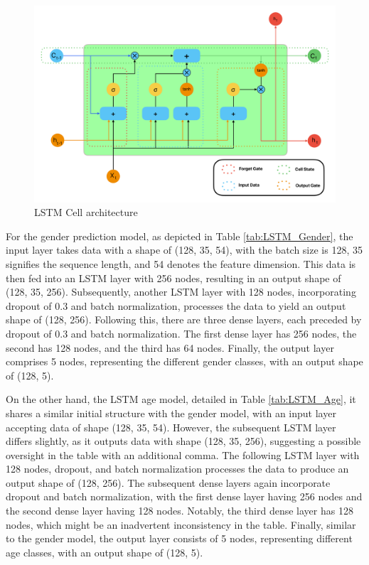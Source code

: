 \documentclass[conference, 10pt,onecolumn]{IEEEtran}
\begin{document}
\begin{figure}
    \centering
    \includegraphics[width=3.5 in]{LSTM cell architecture.pdf}
    \caption{LSTM Cell architecture}
    \label{fig:LSTM cell architecture}
\end{figure}

For the gender prediction model, as depicted in Table \ref{tab:LSTM_Gender}, the input layer takes data with a shape of (128, 35, 54), with the batch size is 128, 35 signifies the sequence length, and 54 denotes the feature dimension. This data is then fed into an LSTM layer with 256 nodes, resulting in an output shape of (128, 35, 256). Subsequently, another LSTM layer with 128 nodes, incorporating dropout of 0.3 and batch normalization, processes the data to yield an output shape of (128, 256). Following this, there are three dense layers, each preceded by dropout of 0.3 and batch normalization. The first dense layer has 256 nodes, the second has 128 nodes, and the third has 64 nodes. Finally, the output layer comprises 5 nodes, representing the different gender classes, with an output shape of (128, 5).

On the other hand, the LSTM age model, detailed in Table \ref{tab:LSTM_Age}, it shares a similar initial structure with the gender model, with an input layer accepting data of shape (128, 35, 54). However, the subsequent LSTM layer differs slightly, as it outputs data with shape (128, 35, 256), suggesting a possible oversight in the table with an additional comma. The following LSTM layer with 128 nodes, dropout, and batch normalization processes the data to produce an output shape of (128, 256). The subsequent dense layers again incorporate dropout and batch normalization, with the first dense layer having 256 nodes and the second dense layer having 128 nodes. Notably, the third dense layer has 128 nodes, which might be an inadvertent inconsistency in the table. Finally, similar to the gender model, the output layer consists of 5 nodes, representing different age classes, with an output shape of (128, 5).
\end{document}
